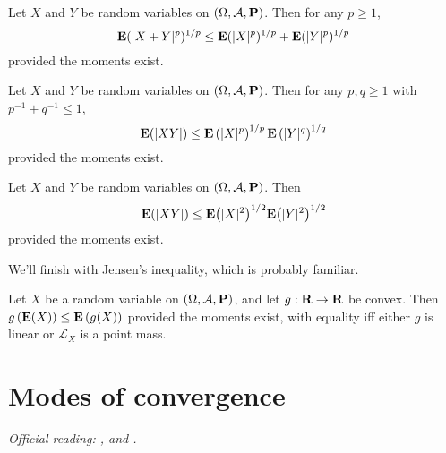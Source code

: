 \documentclass[11pt,letterpaper,reqno,oneside]{article}
\begin{document}
\begin{theorem}
	Let $X$ and $Y$ be random variables on $(\Omega,\mathcal{A},\mathbf{P})$. Then for any $p \geq 1$,
	\begin{equation*}
		\mathbf{E}(\lvert X+Y\rvert^p)^{1/p} \leq \mathbf{E}( \lvert X\rvert^p )^{1/p} + \mathbf{E}( \lvert Y\rvert^p )^{1/p} 
	\end{equation*}
	provided the moments exist.
\end{theorem}


\begin{theorem}
	Let $X$ and $Y$ be random variables on $(\Omega,\mathcal{A},\mathbf{P})$. Then for any $p,q \geq 1$ with $p^{-1} + q^{-1} \leq 1$,
	\begin{equation*}
		\mathbf{E}(\lvert XY\rvert) \leq \mathbf{E}\left( \lvert X\rvert^p \right)^{1/p} \mathbf{E}\left( \lvert Y\rvert^q \right)^{1/q} 
	\end{equation*}
	provided the moments exist.
\end{theorem}


\begin{corollary}
	Let $X$ and $Y$ be random variables on $(\Omega,\mathcal{A},\mathbf{P})$. Then
	\begin{equation*}
		\mathbf{E}(\lvert XY\rvert) \leq \mathbf{E}\bigl( \lvert X\rvert^2 \bigr)^{1/2} \mathbf{E}\bigl( \lvert Y\rvert^2 \bigr)^{1/2} 
	\end{equation*}
	provided the moments exist.
\end{corollary}


We'll finish with Jensen's inequality, which is probably familiar.
%
\begin{theorem}
	Let $X$ be a random variable on $(\Omega,\mathcal{A},\mathbf{P})$, and let $g : \mathbf{R} \to \mathbf{R}$ be convex. Then $g\left( \mathbf{E}(X) \right) \leq \mathbf{E}\left( g(X) \right)$ provided the moments exist, with equality iff either $g$ is linear or $\mathcal{L}_X$ is a point mass.
\end{theorem}



\pagebreak
\section{Modes of convergence}
\label{sec:modes_of_convergence}

\emph{%
Official reading: \textcite[][ch. 3]{Amemiya1985}, \textcite[][ch. 2]{Rao1973} and \textcite[][ch. 1]{Serfling1980}.}
\end{document}
